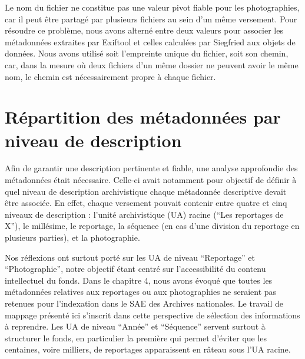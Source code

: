 Le nom du fichier ne constitue pas une valeur pivot fiable pour les photographies, car il peut être partagé par plusieurs fichiers au sein d'un même versement. Pour résoudre ce problème, nous avons alterné entre deux valeurs pour associer les métadonnées extraites par Exiftool et celles calculées par Siegfried aux objets de données. Nous avons utilisé soit l'empreinte unique du fichier, soit son chemin, car, dans la mesure où deux fichiers d'un même dossier ne peuvent avoir le même nom, le chemin est nécessairement propre à chaque fichier.

\section{Répartition des métadonnées par niveau de description}
Afin de garantir une description pertinente et fiable, une analyse approfondie des métadonnées était nécessaire. Celle-ci avait notamment pour objectif de définir à quel niveau de description archivistique chaque métadonnée descriptive devait être associée. En effet, chaque versement pouvait contenir entre quatre et cinq niveaux de description : l'unité archivistique (UA) racine (\enquote{Les reportages de X}), le millésime, le reportage, la séquence (en cas d'une division du reportage en plusieurs parties), et la photographie.

Nos réflexions ont surtout porté sur les UA de niveau \enquote{Reportage} et \enquote{Photographie}, notre objectif étant centré sur l'accessibilité du contenu intellectuel du fonds. Dans le chapitre 4, nous avons évoqué que toutes les métadonnées relatives aux reportages ou aux photographies ne seraient pas retenues pour l'indexation dans le SAE des Archives nationales. Le travail de mappage présenté ici s'inscrit dans cette perspective de sélection des informations à reprendre. Les UA de niveau \enquote{Année} et \enquote{Séquence} servent surtout à structurer le fonds, en particulier la première qui permet d'éviter que les centaines, voire milliers, de reportages apparaissent en râteau sous l'UA racine. 

